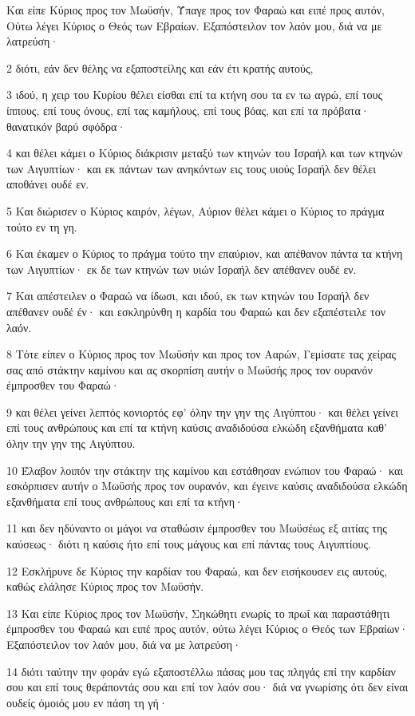 \par Και είπε Κύριος προς τον Μωϋσήν, Ύπαγε προς τον Φαραώ και ειπέ προς αυτόν, Ούτω λέγει Κύριος ο Θεός των Εβραίων. Εξαπόστειλον τον λαόν μου, διά να με λατρεύση·
\par 2 διότι, εάν δεν θέλης να εξαποστείλης και εάν έτι κρατής αυτούς,
\par 3 ιδού, η χειρ του Κυρίου θέλει είσθαι επί τα κτήνη σου τα εν τω αγρώ, επί τους ίππους, επί τους όνους, επί τας καμήλους, επί τους βόας, και επί τα πρόβατα· θανατικόν βαρύ σφόδρα·
\par 4 και θέλει κάμει ο Κύριος διάκρισιν μεταξύ των κτηνών του Ισραήλ και των κτηνών των Αιγυπτίων· και εκ πάντων των ανηκόντων εις τους υιούς Ισραήλ δεν θέλει αποθάνει ουδέ εν.
\par 5 Και διώρισεν ο Κύριος καιρόν, λέγων, Αύριον θέλει κάμει ο Κύριος το πράγμα τούτο εν τη γη.
\par 6 Και έκαμεν ο Κύριος το πράγμα τούτο την επαύριον, και απέθανον πάντα τα κτήνη των Αιγυπτίων· εκ δε των κτηνών των υιών Ισραήλ δεν απέθανεν ουδέ εν.
\par 7 Και απέστειλεν ο Φαραώ να ίδωσι, και ιδού, εκ των κτηνών του Ισραήλ δεν απέθανεν ουδέ έν· και εσκληρύνθη η καρδία του Φαραώ και δεν εξαπέστειλε τον λαόν.
\par 8 Τότε είπεν ο Κύριος προς τον Μωϋσήν και προς τον Ααρών, Γεμίσατε τας χείρας σας από στάκτην καμίνου και ας σκορπίση αυτήν ο Μωϋσής προς τον ουρανόν έμπροσθεν του Φαραώ·
\par 9 και θέλει γείνει λεπτός κονιορτός εφ' όλην την γην της Αιγύπτου· και θέλει γείνει επί τους ανθρώπους και επί τα κτήνη καύσις αναδιδούσα ελκώδη εξανθήματα καθ' όλην την γην της Αιγύπτου.
\par 10 Έλαβον λοιπόν την στάκτην της καμίνου και εστάθησαν ενώπιον του Φαραώ· και εσκόρπισεν αυτήν ο Μωϋσής προς τον ουρανόν, και έγεινε καύσις αναδιδούσα ελκώδη εξανθήματα επί τους ανθρώπους και επί τα κτήνη·
\par 11 και δεν ηδύναντο οι μάγοι να σταθώσιν έμπροσθεν του Μωϋσέως εξ αιτίας της καύσεως· διότι η καύσις ήτο επί τους μάγους και επί πάντας τους Αιγυπτίους.
\par 12 Εσκλήρυνε δε Κύριος την καρδίαν του Φαραώ, και δεν εισήκουσεν εις αυτούς, καθώς ελάλησε Κύριος προς τον Μωϋσήν.
\par 13 Και είπε Κύριος προς τον Μωϋσήν, Σηκώθητι ενωρίς το πρωΐ και παραστάθητι έμπροσθεν του Φαραώ και ειπέ προς αυτόν, ούτω λέγει Κύριος ο Θεός των Εβραίων· Εξαπόστειλον τον λαόν μου, διά να με λατρεύση·
\par 14 διότι ταύτην την φοράν εγώ εξαποστέλλω πάσας μου τας πληγάς επί την καρδίαν σου και επί τους θεράποντάς σου και επί τον λαόν σου· διά να γνωρίσης ότι δεν είναι ουδείς όμοιός μου εν πάση τη γή·
